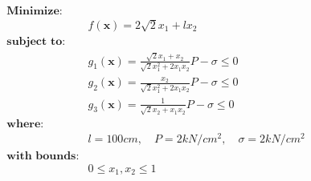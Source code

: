 \begin{align*}
\textbf{Minimize:} & \\
& f(\bm{x}) = 2 \sqrt{2} x_1 + l x_2\\[0.5em]
\textbf{subject to:} &\\
& g_1(\bm{x}) = \frac{\sqrt{2} x_1 + x_2}{\sqrt{2} x_1^2 + 2 x_1 x_2} P - \sigma \leq 0 \\
& g_2(\bm{x}) = \frac{x_2}{\sqrt{2} x_1^2 + 2 x_1 x_2} P - \sigma \leq 0 \\
& g_3(\bm{x}) = \frac{1}{\sqrt{2} x_2 + x_1 x_2} P - \sigma \leq 0 \\[0.5em]
\textbf{where:} & \\
& l = 100cm, \quad P = 2 kN/cm^2, \quad \sigma = 2 kN/cm^2 \\[0.5em]
\textbf{with bounds:} & \\
& 0 \leq x_1, x_2 \leq 1
\end{align*}